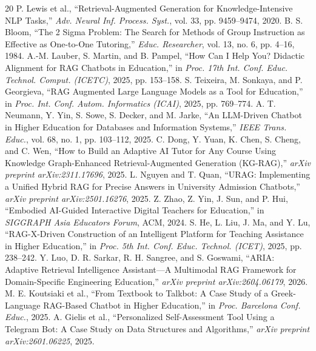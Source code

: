 \documentclass[conference]{IEEEtran}
\begin{document}
\begin{thebibliography}{20}
P. Lewis et al., ``Retrieval-Augmented Generation for Knowledge-Intensive
NLP Tasks,'' \textit{Adv. Neural Inf. Process. Syst.}, vol. 33,
pp. 9459--9474, 2020.
B. S. Bloom, ``The 2 Sigma Problem: The Search for Methods of Group
Instruction as Effective as One-to-One Tutoring,'' \textit{Educ.
Researcher}, vol. 13, no. 6, pp. 4--16, 1984.
A.-M. Lauber, S. Martin, and B. Pampel, ``How Can I Help You? Didactic
Alignment for RAG Chatbots in Education,'' in \textit{Proc. 17th Int.
Conf. Educ. Technol. Comput. (ICETC)}, 2025, pp. 153--158.
S. Teixeira, M. Sonkaya, and P. Georgieva, ``RAG Augmented Large
Language Models as a Tool for Education,'' in \textit{Proc. Int. Conf.
Autom. Informatics (ICAI)}, 2025, pp. 769--774.
A. T. Neumann, Y. Yin, S. Sowe, S. Decker, and M. Jarke,
``An LLM-Driven Chatbot in Higher Education for Databases and
Information Systems,'' \textit{IEEE Trans. Educ.}, vol. 68, no. 1,
pp. 103--112, 2025.
C. Dong, Y. Yuan, K. Chen, S. Cheng, and C. Wen, ``How to Build an
Adaptive AI Tutor for Any Course Using Knowledge Graph-Enhanced
Retrieval-Augmented Generation (KG-RAG),''
\textit{arXiv preprint arXiv:2311.17696}, 2025.
L. Nguyen and T. Quan, ``URAG: Implementing a Unified Hybrid RAG for
Precise Answers in University Admission Chatbots,''
\textit{arXiv preprint arXiv:2501.16276}, 2025.
Z. Zhao, Z. Yin, J. Sun, and P. Hui, ``Embodied AI-Guided Interactive
Digital Teachers for Education,'' in \textit{SIGGRAPH Asia Educators
Forum}, ACM, 2024.
S. He, L. Liu, J. Ma, and Y. Lu, ``RAG-X-Driven Construction of an
Intelligent Platform for Teaching Assistance in Higher Education,''
in \textit{Proc. 5th Int. Conf. Educ. Technol. (ICET)}, 2025,
pp. 238--242.
Y. Luo, D. R. Sarkar, R. H. Sangree, and S. Goswami,
``ARIA: Adaptive Retrieval Intelligence Assistant---A Multimodal RAG
Framework for Domain-Specific Engineering Education,''
\textit{arXiv preprint arXiv:2604.06179}, 2026.
M. E. Koutsiaki et al., ``From Textbook to Talkbot: A Case Study of a
Greek-Language RAG-Based Chatbot in Higher Education,'' in
\textit{Proc. Barcelona Conf. Educ.}, 2025.
A. Gielis et al., ``Personalized Self-Assessment Tool Using a Telegram
Bot: A Case Study on Data Structures and Algorithms,''
\textit{arXiv preprint arXiv:2601.06225}, 2025.

\end{thebibliography}
\end{document}

